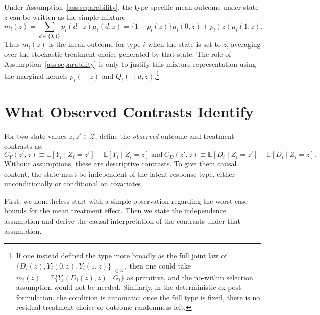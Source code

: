 \documentclass[11pt]{article}
\newcommand{\E}{\mathbb{E}}
\newcommand{\1}{\mathbf{1}}
\newcommand{\cZ}{\mathcal{Z}}
\begin{document}
Under Assumption~\ref{ass:separability}, the type-specific mean outcome under
state \(z\) can be written as the simple mixture
\[
m_i(z)
=
\sum_{d\in\{0,1\}}p_i(d\mid z)\mu_i(d,z)
=
\{1-p_i(z)\}\mu_i(0,z)+p_i(z)\mu_i(1,z).
\]
Thus \(m_i(z)\) is the mean outcome for type \(i\) when the state is set to
\(z\), averaging over the stochastic treatment choice generated by that state. The role of Assumption~\ref{ass:separability} is only to justify this mixture
representation using the marginal kernels \(p_i(\cdot\mid z)\) and
\(Q_i(\cdot\mid d,z)\).\footnote{If one instead defined the type more broadly as the
full joint law of
$\{D_i(z),Y_i(0,z),Y_i(1,z)\}_{z\in\mathcal Z},$ then one could take
$m_i(z)=\E\{Y_i(D_i(z),z)\mid G_i\}$
as primitive, and the no-within selection assumption would not be needed.
Similarly, in the deterministic ex post formulation, the condition is automatic:
once the full type is fixed, there is no residual treatment choice or outcome
randomness left.}


\section{What Observed Contrasts Identify}
\label{sec:observedcontrasts}

For two state values $z,z'\in\cZ$, define the \emph{observed} outcome and treatment contrasts as:
\[
        C_Y(z',z) \equiv \E[Y_i\mid Z_i=z']-\E[Y_i\mid Z_i=z] ~ \textrm{and} ~ C_D(z',z) \equiv \E[D_i\mid Z_i=z']-\E[D_i\mid Z_i=z].
\]
Without assumptions, these are descriptive contrasts. To give them causal content, the state must be independent of the latent response type, either unconditionally or conditional on covariates. 

First, we nonetheless start with a simple observation regarding the worst case bounds for the mean treatment effect. Then we state the independence assumption and derive the causal interpretation of the contrasts under that assumption.
\end{document}
